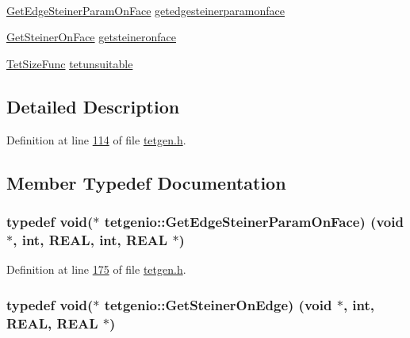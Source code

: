 \begin{DoxyCompactItemize}
$$\item 
\hyperlink{classtetgenio_ad0078621198b377323d048cbcb2fe276}{Get\+Edge\+Steiner\+Param\+On\+Face} \hyperlink{classtetgenio_adc6e23ad6a58080844e7096a60d667cf}{getedgesteinerparamonface}
\item 
\hyperlink{classtetgenio_a3e77872e867758e38d5682a3042119d2}{Get\+Steiner\+On\+Face} \hyperlink{classtetgenio_a611b575fcfc845416f2d151afcf5c6aa}{getsteineronface}
\item 
\hyperlink{classtetgenio_a9be33b16e8ace07e123954b4f10629e5}{Tet\+Size\+Func} \hyperlink{classtetgenio_ad57af35c7c480da03af06b1388a4a8f7}{tetunsuitable}
\end{DoxyCompactItemize}


\subsection{Detailed Description}


Definition at line \hyperlink{tetgen_8h_source_l00114}{114} of file \hyperlink{tetgen_8h_source}{tetgen.\+h}.



\subsection{Member Typedef Documentation}
\subsubsection[{\texorpdfstring{Get\+Edge\+Steiner\+Param\+On\+Face}{GetEdgeSteinerParamOnFace}}]{\setlength{\rightskip}{0pt plus 5cm}typedef void($\ast$  tetgenio\+::\+Get\+Edge\+Steiner\+Param\+On\+Face) (void $\ast$, int, {\bf R\+E\+AL}, int, {\bf R\+E\+AL} $\ast$)}\hypertarget{classtetgenio_ad0078621198b377323d048cbcb2fe276}{}\label{classtetgenio_ad0078621198b377323d048cbcb2fe276}


Definition at line \hyperlink{tetgen_8h_source_l00175}{175} of file \hyperlink{tetgen_8h_source}{tetgen.\+h}.

\subsubsection[{\texorpdfstring{Get\+Steiner\+On\+Edge}{GetSteinerOnEdge}}]{\setlength{\rightskip}{0pt plus 5cm}typedef void($\ast$  tetgenio\+::\+Get\+Steiner\+On\+Edge) (void $\ast$, int, {\bf R\+E\+AL}, {\bf R\+E\+AL} $\ast$)}\hypertarget{classtetgenio_a1c16b3a4c3d5a0166f989fa62a0ea575}{}\label{classtetgenio_a1c16b3a4c3d5a0166f989fa62a0ea575}


